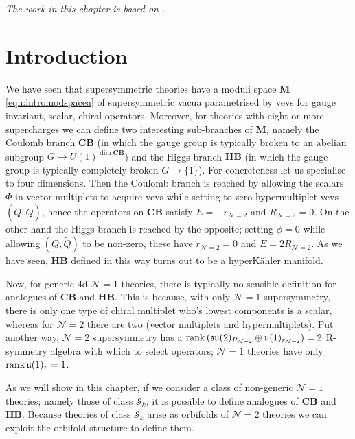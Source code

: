 \documentclass[main.tex]{subfiles}
\begin{document}
\textit{The work in this chapter is based on \cite{SkHBCB}.}

\section{Introduction}
We have seen that supersymmetric theories have a moduli space $\mathbf{M}$ \eqref{eqn:intromodspacea} of supersymmetric vacua parametrised by vevs for gauge invariant, scalar, chiral operators. Moreover, for theories with eight or more supercharges we can define two interesting sub-branches of  $\mathbf{M}$, namely the Coulomb branch $\mathbf{CB}$ (in which the gauge group is typically broken to an abelian subgroup $G\to U(1)^{\dim\mathbf{CB}}$) and the Higgs branch $\mathbf{HB}$ (in which the gauge group is typically completely broken $G\to\{1\}$). For concreteness let us specialise to four dimensions. Then the Coulomb branch is reached by allowing the scalars $\Phi$ in vector multiplets to acquire vevs while setting to zero hypermultiplet vevs $(Q,\widetilde{Q})$, hence the operators on $\mathbf{CB}$ satisfy $E=-r_{\mathcal{N}=2}$ and $R_{\mathcal{N}=2}=0$. On the other hand the Higgs branch is reached by the opposite; setting $\phi=0$ while allowing $(Q,\widetilde{Q})$ to be non-zero, these have $r_{\mathcal{N}=2}=0$ and $E=2R_{\mathcal{N}=2}$. As we have seen, $\mathbf{HB}$ defined in this way turns out to be a hyperK\"ahler manifold.

Now, for generic 4d $\mathcal{N}=1$ theories, there is typically no sensible definition for analogues of $\mathbf{CB}$ and $\mathbf{HB}$. This is because, with only $\mathcal{N}=1$ supersymmetry, there is only one type of chiral multiplet who's lowest components is a scalar, whereas for $\mathcal{N}=2$ there are two (vector multiplets and hypermultiplets). Put another way, $\mathcal{N}=2$ supersymmetry has a $\operatorname{rank}\left(\mathfrak{su}(2)_{R_{\mathcal{N}=2}}\oplus\mathfrak{u}(1)_{r_{\mathcal{N}=2}}\right)=2$ R-symmetry algebra with which to select operators; $\mathcal{N}=1$ theories have only $\operatorname{rank}\mathfrak{u}(1)_r=1$.

As we will show in this chapter, if we consider a class of non-generic $\mathcal{N}=1$ theories; namely those of class $\mathcal{S}_k$, it is possible to define analogues of $\mathbf{CB}$ and $\mathbf{HB}$. Because theories of class $\mathcal{S}_k$ arise as orbifolds of $\mathcal{N}=2$ theories we can exploit the orbifold structure to define them.
\end{document}
